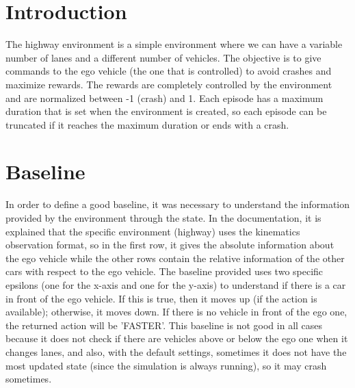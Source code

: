 \documentclass{article}
\begin{document}

\begin{abstract}
This project investigates the possibility of using a reinforcement learning agent to avoid crashes in the given highway environment \cite{highway-env}. This project compares the output of the best RL agent found with a specific baseline and with the human controlling the car. The baseline explained in Section \ref{section:Baseline} is defined in order to be an informed guess of the action that must be taken. To find the best RL agent, three different approaches are investigated: Double Deep Q-Network (DQN), Dueling Deep Q-Network (DQN), and Proximal Policy Optimization (PPO). These 3 approaches are presented in Section \ref{section:Approaches}.
\end{abstract}

\section{Introduction} \label{section:Introduction}
The highway environment \cite{highway-env} is a simple environment where we can have a variable number of lanes and a different number of vehicles. The objective is to give commands to the ego vehicle (the one that is controlled) to avoid crashes and maximize rewards. The rewards are completely controlled by the environment and are normalized between -1 (crash) and 1. Each episode has a maximum duration that is set when the environment is created, so each episode can be truncated if it reaches the maximum duration or ends with a crash.

\section{Baseline}\label{section:Baseline}
In order to define a good baseline, it was necessary to understand the information provided by the environment \cite{highway-env} through the state. In the documentation, it is explained that the specific environment (highway) uses the kinematics observation format, so in the first row, it gives the absolute information about the ego vehicle while the other rows contain the relative information of the other cars with respect to the ego vehicle.
The baseline provided uses two specific epsilons (one for the x-axis and one for the y-axis) to understand if there is a car in front of the ego vehicle. If this is true, then it moves up (if the action is available); otherwise, it moves down. If there is no vehicle in front of the ego one, the returned action will be 'FASTER'.
This baseline is not good in all cases because it does not check if there are vehicles above or below the ego one when it changes lanes, and also, with the default settings, sometimes it does not have the most updated state (since the simulation is always running), so it may crash sometimes.
\end{document}

